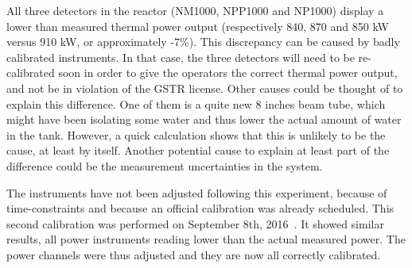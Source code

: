 \begin{SingleSpace}
All three detectors in the reactor (NM1000, NPP1000 and NP1000) display a lower than measured thermal power output (respectively 840, 870 and 850 kW versus 910 kW, or approximately -7\%). This discrepancy can be caused by badly calibrated instruments. In that case, the three detectors will need to be re-calibrated soon in order to give the operators the correct thermal power output, and not be in violation of the GSTR license. Other causes could be thought of to explain this difference. One of them is a quite new 8 inches beam tube, which might have been isolating some water and thus lower the actual amount of water in the tank. However, a quick calculation shows that this is unlikely to be the cause, at least by itself. Another potential cause to explain at least part of the difference could be the measurement uncertainties in the system.

The instruments have not been adjusted following this experiment, because of time-constraints and because an official calibration was already scheduled. This second calibration was performed on September 8th, 2016~\cite{reactor02}. It showed similar results, all power instruments reading lower than the actual measured power. The power channels were thus adjusted and they are now all correctly calibrated.
\end{SingleSpace}
\clearpage
